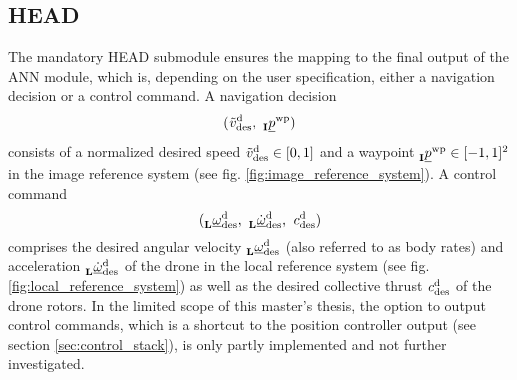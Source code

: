 \subsection*{HEAD}
The mandatory HEAD submodule
ensures the mapping 
to the final output of the ANN module,
which is,
depending on the user specification,
either a navigation decision
or a control command.
A navigation decision 
\begin{equation} \label{eq:navigation_decision}
    (
        \speed[\norm]{\drone}{\desired}{}{}
        ,\ 
        \pos[]{\wayp}{}{\irs}{}
    )
\end{equation}
consists of a normalized desired speed 
$\speed[\norm]{\drone}{\desired}{}{} \in [0, 1]$
and a waypoint
$\pos[]{\wayp}{}{\irs}{} \in [-1, 1]^2$
in the image reference system
(see fig. \ref{fig:image_reference_system}).
A control command 
\begin{equation}
    (
        \angvel[]{\drone}{\desired}{\lrs}{},\ 
        \angvel[\dot]{\drone}{\desired}{\lrs}{},\ 
        \anything[]{\drone}{\desired}{}{}{c}
    )
\end{equation}
comprises the desired angular velocity
$\angvel[]{\drone}{\desired}{\lrs}{}$
(also referred to as body rates)
and acceleration
$\angvel[\dot]{\drone}{\desired}{\lrs}{}$
of the drone in the local reference system 
(see fig. \ref{fig:local_reference_system})
as well as the desired collective thrust 
$\anything[]{\drone}{\desired}{}{}{c}$
of the drone rotors.
In the limited scope of this master's thesis,
the option to output control commands,
which is a shortcut to the position controller output 
(see section \ref{sec:control_stack}),
is only partly implemented and not further investigated.

